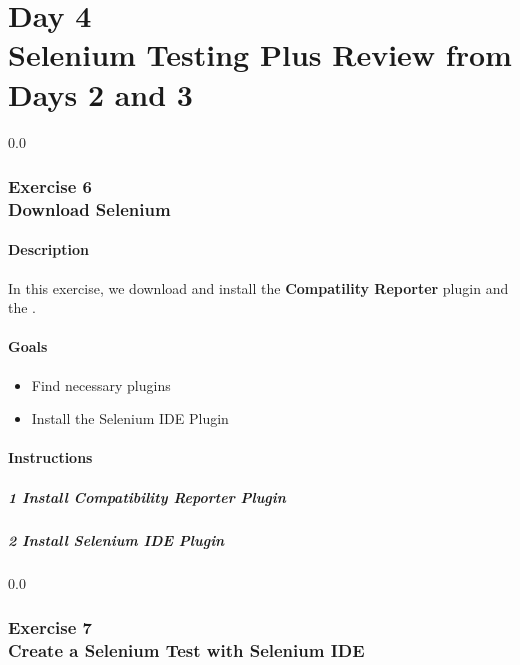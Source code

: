 \part*{Day 4\\ Selenium Testing Plus Review from Days 2 and 3}
{\setlength{\baselineskip}%
  {0.0\baselineskip}
  \section*{\flushright Exercise 6\\
 Download Selenium}
  \hrulefill \par}

\subsection*{Description}
In this exercise, we download and install the \textbf{Compatility
  Reporter} plugin and the .

\subsection*{Goals}
\begin{itemize}
  \item Find necessary plugins
  \item Install the Selenium IDE Plugin
\end{itemize}

\subsection*{Instructions}

\subsubsection*{1 Install Compatibility Reporter Plugin}

\subsubsection*{2 Install Selenium IDE Plugin}

{\setlength{\baselineskip}%
  {0.0\baselineskip}
  \section*{\flushright Exercise 7\\
 Create a Selenium Test with Selenium IDE}
  \hrulefill \par}

